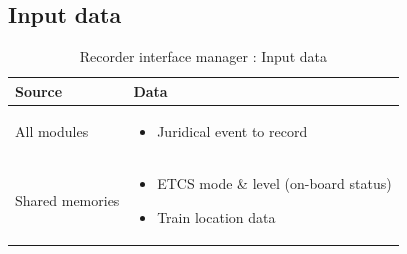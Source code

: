 \documentclass[nocc]{template/openetcs_report}
\begin{document}
\subsection{Input data}
			\begin{longtable}{|l|l|}
				\caption{Recorder interface manager : Input data}\\ 
				\hline
				
					\begin{minipage}[t]{0.35\linewidth} \textbf{Source}	\end{minipage} 
				&	\begin{minipage}[t]{0.65\linewidth} \textbf{Data} \end{minipage} \\
				
				\hline
																																									
					\begin{minipage}[t]{0.35\linewidth} All modules	\end{minipage} 
				&	\begin{minipage}[t]{0.65\linewidth}
						\begin{itemize}
							\item Juridical event to record
						\end{itemize}
					\end{minipage} \\
				
				\hline
				
					\begin{minipage}[t]{0.35\linewidth} Shared memories	\end{minipage} 
				&	\begin{minipage}[t]{0.65\linewidth}
						\begin{itemize}
							\item ETCS mode \& level (on-board status)
							\item Train location data
						\end{itemize}				
					\end{minipage} \\
				
				\hline	
			\end{longtable}	
\end{document}
